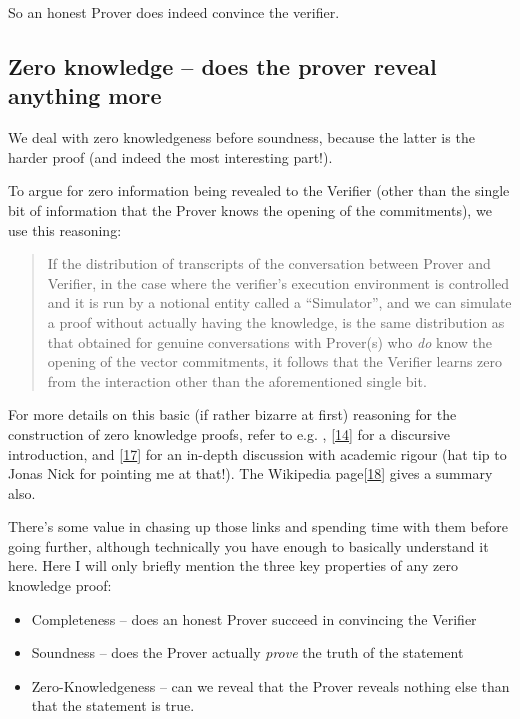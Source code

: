 \documentclass[10pt,a4paper]{article}
\providecommand{\tightlist}{%
  \setlength{\itemsep}{0pt}\setlength{\parskip}{0pt}}
\begin{document}
So an honest Prover does indeed convince the verifier.

\hypertarget{zero-knowledge-does-the-prover-reveal-anything-more}{%
\subsection[Zero knowledge -- does the prover reveal anything
more]{\texorpdfstring{\protect\hypertarget{anchor-25}{}{}Zero knowledge
-- does the prover reveal anything
more}{Zero knowledge -- does the prover reveal anything more}}\label{zero-knowledge-does-the-prover-reveal-anything-more}}

We deal with zero knowledgeness before soundness, because the latter is
the harder proof (and indeed the most interesting part!).

To argue for zero information being revealed to the Verifier (other than
the single bit of information that the Prover knows the opening of the
commitments), we use this reasoning:

\begin{quote}
If the distribution of transcripts of the conversation between Prover
and Verifier, in the case where the verifier's execution environment is
controlled and it is run by a notional entity called a ``Simulator'',
and we can simulate a proof without actually having the knowledge, is
the same distribution as that obtained for genuine conversations with
Prover(s) who \emph{do} know the opening of the vector commitments, it
follows that the Verifier learns zero from the interaction other than
the aforementioned single bit.
\end{quote}

For more details on this basic (if rather bizarre at first) reasoning
for the construction of zero knowledge proofs, refer to e.g. ,
{[}\protect\hyperlink{anchor-26}{14}{]} for a discursive introduction,
and {[}\protect\hyperlink{anchor-27}{17}{]} for an in-depth discussion
with academic rigour (hat tip to Jonas Nick for pointing me at that!).
The Wikipedia page{[}\protect\hyperlink{anchor-28}{18}{]} gives a
summary also.

There's some value in chasing up those links and spending time with them
before going further, although technically you have enough to basically
understand it here. Here I will only briefly mention the three key
properties of any zero knowledge proof:

\begin{itemize}
\tightlist
\item
  Completeness -- does an honest Prover succeed in convincing the
  Verifier
\item
  Soundness -- does the Prover actually \emph{prove} the truth of the
  statement
\item
  Zero-Knowledgeness -- can we reveal that the Prover reveals nothing
  else than that the statement is true.
\end{itemize}
\end{document}
